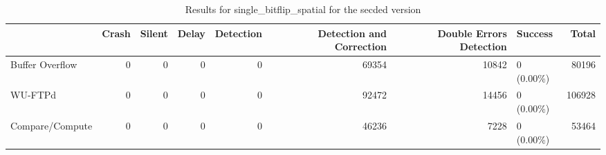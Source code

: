 \begin{table}[t]
	\centering
	\caption{Results for single_bitflip_spatial for the secded version}
	\label{table:end_sim_by_status_secded_2_single_bitflip_spatial}
	\begin{tabular}{lrrrrrrlr}
		\toprule
		                & Crash & Silent & Delay & Detection & Detection and Correction & Double Errors Detection & Success    & Total  \\
		\midrule
		Buffer Overflow & 0     & 0      & 0     & 0         & 69354                    & 10842                   & 0 (0.00\%) & 80196  \\
		WU-FTPd         & 0     & 0      & 0     & 0         & 92472                    & 14456                   & 0 (0.00\%) & 106928 \\
		Compare/Compute & 0     & 0      & 0     & 0         & 46236                    & 7228                    & 0 (0.00\%) & 53464  \\
		\bottomrule
	\end{tabular}
\end{table}
